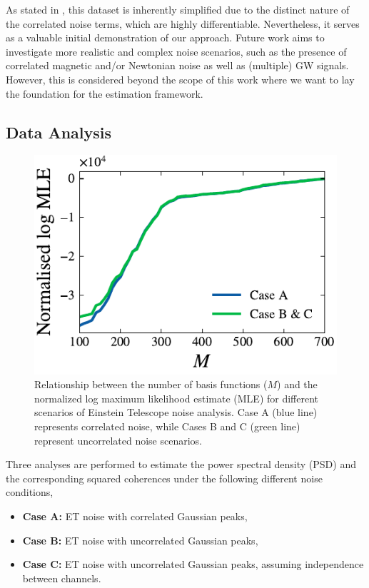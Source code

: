 \documentclass[%
 reprint,
 amsmath,amssymb,
 aps,
 nofootinbib,
]{revtex4-2}
\begin{document}
As stated in \citet{Janssens2023}, this dataset is inherently simplified due to the distinct nature of the correlated noise terms, which are highly differentiable.
Nevertheless, it serves as a valuable initial demonstration of our approach.
Future work aims to investigate more realistic and complex noise scenarios, such as the presence of correlated magnetic \citet{Janssens_magnetic_noise,Ball_lightning_strokes} and/or Newtonian noise \cite{Janssens_newtonian_seismic,PhysRevD.109.102002} as well as (multiple) GW signals. However, this is considered beyond the scope of this work where we want to lay the foundation for the estimation framework.

\subsection{Data Analysis}


\begin{figure}[!t]
\centering
  \includegraphics[width=\columnwidth]{et_basis_fns.pdf}
  \caption{Relationship between the number of basis functions ($M$) and the normalized log maximum likelihood estimate (MLE) for different scenarios of Einstein Telescope noise analysis. Case A (blue line) represents correlated noise, while Cases B and C (green line) represent uncorrelated noise scenarios.
  }
  \label{et_corr_basis_funs_vs_mle}
\end{figure}


Three analyses are performed to estimate the power spectral density (PSD) and the corresponding squared coherences under the following different noise conditions, 
\begin{itemize}
\setlength{\itemindent}{-15pt}
    \item[] \textbf{Case A:}  ET noise with correlated Gaussian peaks,
    \item[] \textbf{Case B:} ET noise with uncorrelated Gaussian peaks,
    \item[] \textbf{Case C:} ET noise with uncorrelated Gaussian peaks, assuming independence between channels.
\end{itemize}
\end{document}

